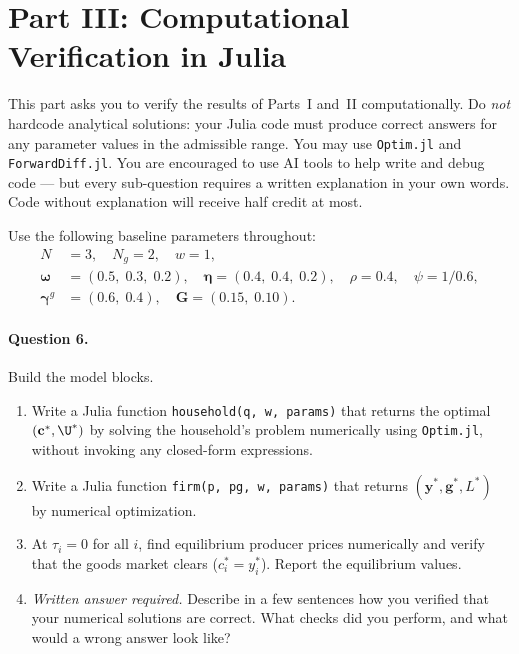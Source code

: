 \section{Part III: Computational Verification in Julia}
\label{sec:julia}
 
\begin{calloutnote}
This part asks you to verify the results of Parts~I and~II computationally. Do \emph{not} hardcode analytical solutions: your Julia code must produce correct answers for any parameter values in the admissible range. You may use \texttt{Optim.jl} and \texttt{ForwardDiff.jl}. You are encouraged to use AI tools to help write and debug code --- but every sub-question requires a written explanation in your own words. Code without explanation will receive half credit at most.
\end{calloutnote}
 
Use the following baseline parameters throughout:
%
\begin{equation}
\begin{aligned}
    N &= 3, \quad N_g = 2, \quad w = 1, \\
    \boldsymbol{\omega} &= (0.5,\; 0.3,\; 0.2), \quad \boldsymbol{\eta} = (0.4,\; 0.4,\; 0.2), \quad \rho = 0.4, \quad \psi = 1/0.6, \\
    \boldsymbol{\gamma}^g &= (0.6,\; 0.4), \quad \mathbf{G} = (0.15,\; 0.10).
\end{aligned}
\label{eq:baseline-params}
\end{equation}
 
\paragraph{Question 6.}
Build the model blocks.
 
\begin{enumerate}[label=(\alph*)]
    \item Write a Julia function \texttt{household(q, w, params)} that returns the optimal $(\mathbf{c}^*, \U^*)$ by solving the household's problem numerically using \texttt{Optim.jl}, without invoking any closed-form expressions.
 
    \item Write a Julia function \texttt{firm(p, pg, w, params)} that returns $(\mathbf{y}^*, \mathbf{g}^*, L^*)$ by numerical optimization.
 
    \item At $\tau_i = 0$ for all $i$, find equilibrium producer prices numerically and verify that the goods market clears ($c_i^* = y_i^*$). Report the equilibrium values.
 
    \item \emph{Written answer required.} Describe in a few sentences how you verified that your numerical solutions are correct. What checks did you perform, and what would a wrong answer look like?
\end{enumerate}
 
